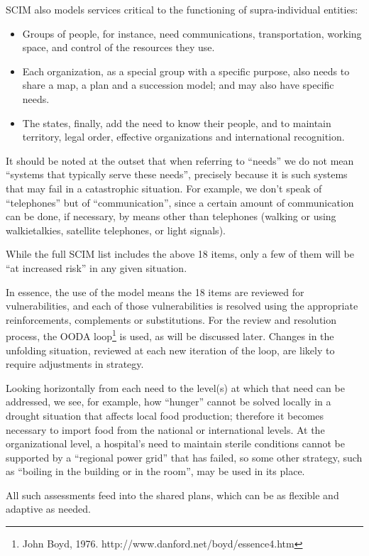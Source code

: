 \documentclass[12pt, a4]{scrartcl}
\begin{document}
SCIM also models services critical to the functioning of supra-individual entities:
\begin{itemize}
	\item Groups of people, for instance, need communications, transportation, working space, and control of the resources they use.
	\item Each organization, as a special group with a specific purpose, also needs to share a map, a plan and a succession model; and may also have specific needs.
	\item The states, finally, add the need to know their people, and to maintain territory, legal order, effective organizations and international recognition.
\end{itemize}

It should be noted at the outset that when referring to “needs” we do not mean “systems that typically serve these needs”, precisely because it is such systems that may fail in a catastrophic situation. For example, we don't speak of “telephones” but of “communication”, since a certain amount of communication can be done, if necessary, by means other than telephones (walking or using walkietalkies, satellite telephones, or light signals).

While the full SCIM list includes the above 18 items, only a few of them will be “at increased risk” in any given situation.

In essence, the use of the model means the 18 items are reviewed for vulnerabilities, and each of those vulnerabilities is resolved using the appropriate reinforcements, complements or substitutions. For the review and resolution process, the OODA loop\footnote{John Boyd, 1976. http://www.danford.net/boyd/essence4.htm} is used, as will be discussed later. Changes in the unfolding situation, reviewed at each new iteration of the loop, are likely to require adjustments in strategy.

Looking horizontally from each need to the level(s) at which that need can be addressed, we see, for example, how “hunger” cannot be solved locally in a drought situation that affects local food production; therefore it becomes necessary to import food from the national or international levels. At the organizational level, a hospital’s need to maintain sterile conditions cannot be supported by a “regional power grid” that has failed, so some other strategy, such as “boiling in the building or in the room”, may be used in its place.

All such assessments feed into the shared plans, which can be as flexible and adaptive as needed.
\end{document}
